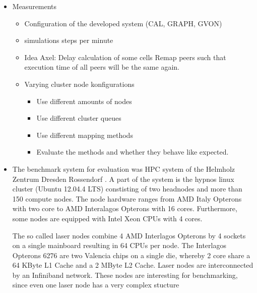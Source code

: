 \begin{itemize}
\item Measurements
  \begin{itemize}
  \item Configuration of the developed system (CAL, GRAPH, GVON)
  \item simulations steps per minute
  \item Idea Axel: Delay calculation of some cells
    Remap peers such that execution time of all peers
    will be the same again.
  \item Varying cluster node konfigurations
    \begin{itemize}
    \item Use different amounts of nodes
    \item Use different cluster queues
    \item Use different mapping methods
    \item Evaluate the methods and whether they
      behave like expected.
    \end{itemize}
  \end{itemize}

\item The benchmark system for evaluation was HPC system of the
  Helmholz Zentrum Dresden Rossendorf \cite{ref:hzdr_cluster}.  A part
  of the system is the hypnos linux cluster (Ubuntu 12.04.4 LTS)
  constisting of two headnodes and more than 150 compute nodes. The
  node hardware ranges from AMD Italy Opterons with two core to AMD
  Interalagos Opterons with 16 cores. Furthermore, some nodes are
  equipped with Intel Xeon CPUs with 4 cores.

  The so called laser nodes combine 4 AMD Interlagos Opterons by 4
  sockets on a single mainboard resulting in 64 CPUs per node.  The
  Interlagos Opterons 6276 are two Valencia chips on a single die,
  whereby 2 core share a 64 KByte L1 Cache and a 2 MByte L2
  Cache. Laser nodes are interconnected by an Infiniband
  network. These nodes are interesting for benchmarking, since even
  one laser node has a very complex stucture




\end{itemize}
